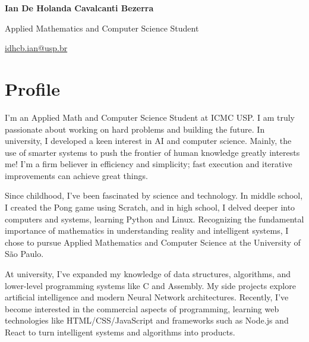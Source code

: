 \documentclass[a4paper,11pt]{article}
\begin{document}
\vspace*{-2cm} %

\begin{center}
\huge\textbf{Ian De Holanda Cavalcanti Bezerra}

\large Applied Mathematics and Computer Science Student

\normalsize\href{mailto:idhcb.ian@usp.br}{idhcb.ian@usp.br}
\end{center}

\section*{Profile}
\vspace{-0.3em}
\begin{multicols}{2}
\setlength{\columnsep}{0.4cm}
\setlength{\parindent}{0pt}
\setlength{\parskip}{0.2em}
\small

I'm an Applied Math and Computer Science Student at ICMC USP. I am truly passionate about working on hard problems and building the future. In university, I developed a keen interest in AI and computer science. Mainly, the use of smarter systems to push the frontier of human knowledge greatly interests me! I'm a firm believer in efficiency and simplicity; fast execution and iterative improvements can achieve great things. 

Since childhood, I've been fascinated by science and technology. In middle school, I created the Pong game using Scratch, and in high school, I delved deeper into computers and systems, learning Python and Linux. Recognizing the fundamental importance of mathematics in understanding reality and intelligent systems, I chose to pursue Applied Mathematics and Computer Science at the University of São Paulo.

At university, I've expanded my knowledge of data structures, algorithms, and lower-level programming systems like C and Assembly. My side projects explore artificial intelligence and modern Neural Network architectures. Recently, I've become interested in the commercial aspects of programming, learning web technologies like HTML/CSS/JavaScript and frameworks such as Node.js and React to turn intelligent systems and algorithms into products.
\end{multicols}
\vspace{-0.3em}
\end{document}
